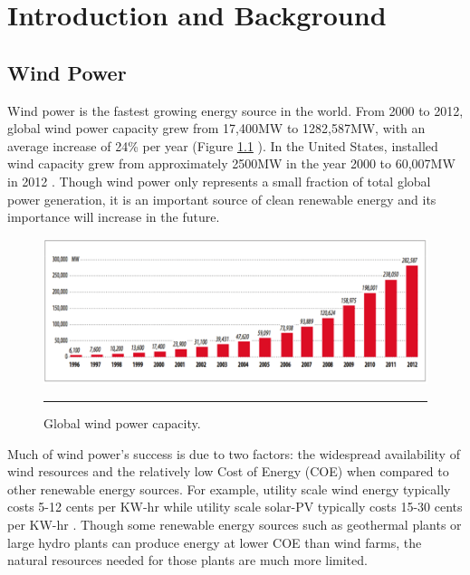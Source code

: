 
\chapter{Introduction and Background} %

\label{Chapter1} %


\section{Wind Power}

Wind power is the fastest growing energy source in the world.  From 2000 to 2012, global wind power capacity grew from 17,400MW to 1282,587MW, with an average increase of 24\% per year (Figure \ref{fig1-1} ). In the United States, installed wind capacity grew from approximately 2500MW in the year 2000 to 60,007MW in 2012 \cite{williams2012}. Though wind power only represents a small fraction of total global power generation, it is an important source of clean renewable energy and its importance will increase in the future.

\begin{figure}[htbp]
	\centering
		\includegraphics[width=\linewidth]{Figures/ch1Figures/fig1-1.png}
		\rule{35em}{0.5pt}
	\caption{Global wind power capacity. \cite{sawyer2012}}
	\label{fig1-1}
\end{figure}

Much of wind power’s success is due to two factors: the widespread availability of wind resources and the relatively low Cost of Energy (COE) when compared to other renewable energy sources.  For example, utility scale wind energy typically costs 5-12 cents per KW-hr while utility scale solar-PV typically costs 15-30 cents per KW-hr \cite{ren212011}. Though some renewable energy sources such as geothermal plants or large hydro plants can produce energy at lower COE than wind farms, the natural resources needed for those plants are much more limited.  


